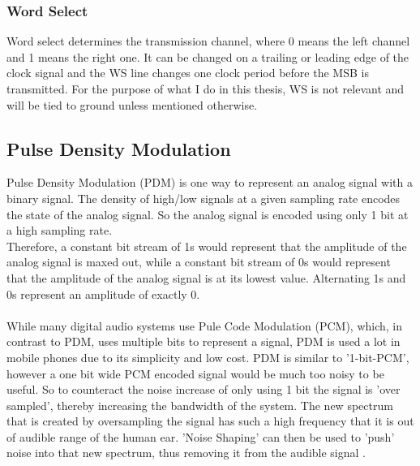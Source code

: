 \subsubsection{Word Select}

Word select determines the transmission channel, where 0 means the left channel and 1 means the right one.
It can be changed on a trailing or leading edge of the clock signal and the WS line changes one clock period
before the MSB is transmitted.
For the purpose of what I do in this thesis, WS is not relevant and will be tied to ground unless mentioned otherwise.

\subsection{Pulse Density Modulation}

Pulse Density Modulation (PDM) is one way to represent an analog signal with a binary signal.
The density of high/low signals at a given sampling rate encodes the state of the analog signal.
So the analog signal is encoded using only 1 bit at a high sampling rate.\\
Therefore, a constant bit stream of 1s would represent that the amplitude of the analog signal is maxed out,
while a constant bit stream of 0s would represent that the amplitude of the analog signal is at its lowest value.
Alternating 1s and 0s represent an amplitude of exactly 0.\\\\
While many digital audio systems use Pule Code Modulation (PCM), which, in contrast to PDM, uses multiple bits to represent a signal,
PDM is used a lot in mobile phones \cite{pdm_utexas} due to its simplicity and low cost.
PDM is similar to '1-bit-PCM', however a one bit wide PCM encoded signal would be much too noisy to be useful.
So to counteract the noise increase of only using 1 bit the signal is 'over sampled', thereby increasing the bandwidth of the system.
The new spectrum that is created by oversampling the signal has such a high frequency that it is out of audible range of the human ear.
'Noise Shaping' can then be used to 'push' noise into that new spectrum, thus removing it from the audible signal \cite{pdm_texas}.
